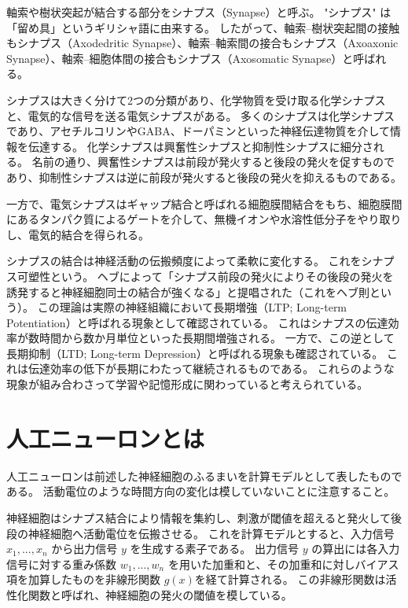 軸索や樹状突起が結合する部分をシナプス（Synapse）と呼ぶ。
"シナプス" は「留め具」というギリシャ語に由来する。
したがって、軸索--樹状突起間の接触もシナプス（Axodedritic Synapse）、軸索--軸索間の接合もシナプス（Axoaxonic Synapse）、軸索--細胞体間の接合もシナプス（Axosomatic Synapse）と呼ばれる。

シナプスは大きく分けて2つの分類があり、化学物質を受け取る化学シナプスと、電気的な信号を送る電気シナプスがある。
多くのシナプスは化学シナプスであり、アセチルコリンやGABA、ドーパミンといった神経伝達物質を介して情報を伝達する。
化学シナプスは興奮性シナプスと抑制性シナプスに細分される。
名前の通り、興奮性シナプスは前段が発火すると後段の発火を促すものであり、抑制性シナプスは逆に前段が発火すると後段の発火を抑えるものである。

一方で、電気シナプスはギャップ結合と呼ばれる細胞膜間結合をもち、細胞膜間にあるタンパク質によるゲートを介して、無機イオンや水溶性低分子をやり取りし、電気的結合を得られる。

シナプスの結合は神経活動の伝搬頻度によって柔軟に変化する。
これをシナプス可塑性という。
ヘブによって「シナプス前段の発火によりその後段の発火を誘発すると神経細胞同士の結合が強くなる」と提唱された（これをヘブ則という）。
この理論は実際の神経組織において長期増強（LTP; Long-term Potentiation）と呼ばれる現象として確認されている。
これはシナプスの伝達効率が数時間から数か月単位といった長期間増強される。
一方で、この逆として長期抑制（LTD; Long-term Depression）と呼ばれる現象も確認されている。
これは伝達効率の低下が長期にわたって継続されるものである。
これらのような現象が組み合わさって学習や記憶形成に関わっていると考えられている。


% 

\section{人工ニューロンとは}

人工ニューロンは前述した神経細胞のふるまいを計算モデルとして表したものである。
活動電位のような時間方向の変化は模していないことに注意すること。

神経細胞はシナプス結合により情報を集約し、刺激が閾値を超えると発火して後段の神経細胞へ活動電位を伝搬させる。
これを計算モデルとすると、入力信号 ${x_1, ..., x_n}$ から出力信号 $ y $ を生成する素子である。
出力信号 $y$ の算出には各入力信号に対する重み係数 ${w_1, ..., w_n} $ を用いた加重和と、その加重和に対しバイアス項を加算したものを非線形関数 $g(x)$を経て計算される。
この非線形関数は活性化関数と呼ばれ、神経細胞の発火の閾値を模している。

